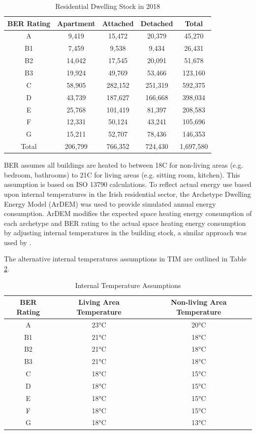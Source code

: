 \documentclass[gmd,manuscript]{copernicus}
\begin{document}
\begin{table}[ht]
 \centering
 \footnotesize
 \caption{Residential Dwelling Stock in 2018}
 \begin{tabular}{ccccc}
 \hline 
 BER Rating & Apartment & Attached & Detached & Total \\ 
 \hline
 A & 9,419 &	15,472 &	20,379 &	45,270 \\
 B1 & 7,459 &	9,538 &	9,434 &	26,431 \\
 B2	& 14,042 &	17,545 &	20,091 &	51,678 \\
 B3 & 19,924 &	49,769 &	53,466 &	123,160 \\
 C & 58,905	& 282,152 &	251,319	& 592,375 \\
 D & 43,739 &	187,627 &	166,668	& 398,034 \\
 E & 25,768 &	101,419 & 	81,397 & 	208,583 \\
 F & 12,331 &	50,124 &	43,241 &	105,696 \\
 G & 15,211 &	52,707 &	78,436 &	146,353 \\
 Total & 206,799 &	766,352	& 724,430 &	1,697,580 \\ \hline 
 \end{tabular}
 \label{Residential Dwelling Stock}
\end{table}

BER assumes all buildings are heated to between 18\textdegree C for non-living areas (e.g. bedroom, bathrooms) to 21\textdegree C for living areas (e.g. sitting room, kitchen). This assumption is based on ISO 13790 calculations. To reflect actual energy use based upon internal temperatures in the Irish residential sector, the Archetype Dwelling Energy Model (ArDEM) \citep{Dineen2015} was used to provide simulated annual energy consumption. ArDEM modifies the expected space heating energy consumption of each archetype and BER rating to the actual space heating energy consumption by adjusting internal temperatures in the building stock, a similar approach was used by \citet{Uidhir2020}.

The alternative internal temperatures assumptions in TIM are outlined in Table \ref{Internal Temperature Assumptions}. 

\begin{table}[ht]
 \centering
 \footnotesize
 \caption{Internal Temperature Assumptions}
 \begin{tabular}{ccc}
 \hline 
 BER Rating & Living Area Temperature & Non-living Area Temperature \\
 \hline
 A & 23°C & 20°C \\
 B1 & 21°C & 18°C \\
 B2	& 21°C & 18°C \\
 B3 & 21°C & 18°C \\
 C & 18°C & 15°C \\
 D & 18°C & 15°C \\
 E & 18°C & 15°C \\
 F & 18°C & 15°C \\
 G & 18°C & 13°C \\ \hline
 \end{tabular}
 
 \label{Internal Temperature Assumptions}
\end{table}
\end{document}
